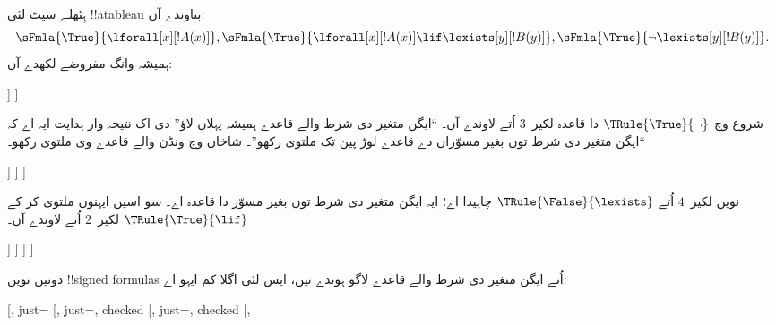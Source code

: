 \documentclass[../../../include/open-logic-section]{subfiles}
\begin{document}
\begin{ex}
ہِٹھلے سیٹ لئی !!a{tableau} بناوندے آں:
\[
\sFmla{\True}{\lforall[x][!A(x)]}, \sFmla{\True}{\lforall[x][!A(x)] 
  \lif \lexists[y][!B(y)]}, \sFmla{\True}{\lnot\lexists[y][!B(y)]}.
\]
ہمیشہ وانگ مفروضے لکھدے آں:
\begin{oltableau}
  [\sFmla{\True}{\lforall[x][\formula{A}(x)]}, just=\TAss
    [\sFmla{\True}{\lforall[x][\formula{A}(x)] \lif
        \lexists[y][\formula{B}(y)]}, just=\TAss
      [\sFmla{\True}{\lnot\lexists[y][\formula{B}(y)]}, just=\TAss
      ]
    ]
  ]
\end{oltableau}
شروع وچ $\TRule{\True}{\lnot}$ دا قاعدہ لکیر~$3$ اُتے
لاوندے آں۔ ``ایگن متغیر دی شرط والے قاعدے ہمیشہ پہلاں لاؤ''
دی اک نتیجہ وار ہدایت ایہ اے کہ ``ایگن متغیر دی شرط توں
بغیر مسوّراں دے قاعدے لوڑ پین تک ملتوی رکھو''۔ شاخاں وچ
ونڈن والے قاعدے وی ملتوی رکھو۔
\begin{oltableau}
  [\sFmla{\True}{\lforall[x][\formula{A}(x)]}, just=\TAss
    [\sFmla{\True}{\lforall[x][\formula{A}(x)] \lif
        \lexists[y][\formula{B}(y)]}, just=\TAss
      [\sFmla{\True}{\lnot\lexists[y][\formula{B}(y)]}, just=\TAss, checked
        [\sFmla{\False}{\lexists[y][\formula{B}(y)]}, just={\TRule{\True}{\lnot}[3]}]
      ]
    ]
  ]
\end{oltableau}
نویں لکیر~$4$ اُتے $\TRule{\False}{\lexists}$ چاہیدا اے؛
ایہ ایگن متغیر دی شرط توں بغیر مسوّر دا قاعدہ اے۔ سو اسیں
ایہنوں ملتوی کر کے $\TRule{\True}{\lif}$ لکیر~$2$ اُتے
لاوندے آں۔
\begin{oltableau}
  [\sFmla{\True}{\lforall[x][\formula{A}(x)]}, just=\TAss
    [\sFmla{\True}{\lforall[x][\formula{A}(x)] \lif
        \lexists[y][\formula{B}(y)]}, just=\TAss, checked
      [\sFmla{\True}{\lnot\lexists[y][\formula{B}(y)]}, just=\TAss, checked
        [\sFmla{\False}{\lexists[y][\formula{B}(y)]},
          just={\TRule{\True}{\lnot}[3]},
          [\sFmla{\False}{\lforall[x][\formula{A}(x)]}, just={\TRule{\True}{\lif}[2]}]
          [\sFmla{\True}{\lexists[y][\formula{B}(y)]}, just={\TRule{\True}{\lif}[2]}]
        ]
      ]
    ]
  ]
\end{oltableau}
دونیں نویں !!{signed formula}s اُتے ایگن متغیر دی شرط والے
قاعدے لاگو ہوندے نیں، ایس لئی اگلا کم ایہو اے:
\begin{oltableau}
  [\sFmla{\True}{\lforall[x][\formula{A}(x)]}, just=\TAss
    [\sFmla{\True}{\lforall[x][\formula{A}(x)] \lif
        \lexists[y][\formula{B}(y)]}, just=\TAss, checked
      [\sFmla{\True}{\lnot\lexists[y][\formula{B}(y)]}, just=\TAss, checked
        [\sFmla{\False}{\lexists[y][\formula{B}(y)]},

\end{oltableau}
\end{ex}
\end{document}

